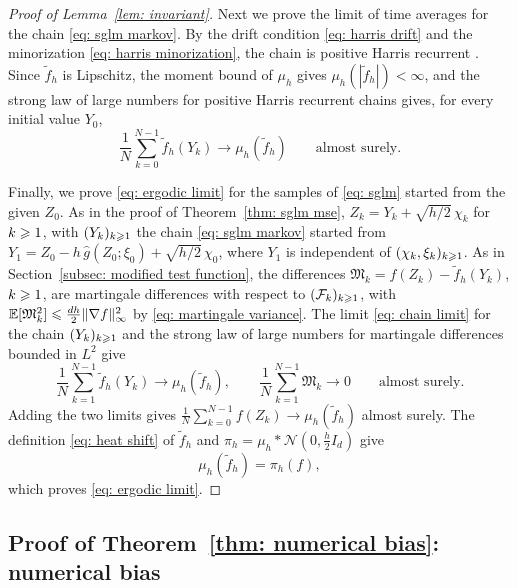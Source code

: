 \begin{proof}[Proof of Lemma~\ref{lem: invariant}]
    Next we prove the limit of time averages for the chain \eqref{eq: sglm markov}. By the drift condition \eqref{eq: harris drift} and the minorization \eqref{eq: harris minorization}, the chain is positive Harris recurrent \citep{meyn1993markov}. Since $\tilde f_h$ is Lipschitz, the moment bound of $\mu_h$ gives $\mu_h(|\tilde f_h|) < \infty$, and the strong law of large numbers for positive Harris recurrent chains \citep[Theorem~17.0.1(i)]{meyn1993markov} gives, for every initial value $Y_0$,
    \begin{equation}
        \frac1N \sum_{k=0}^{N-1} \tilde f_h(Y_k) \to \mu_h(\tilde f_h) \qquad \text{almost surely} .
        \label{eq: chain limit}
    \end{equation}

    Finally, we prove \eqref{eq: ergodic limit} for the samples of \eqref{eq: sglm} started from the given $Z_0$. As in the proof of Theorem~\ref{thm: sglm mse}, $Z_k = Y_k + \sqrt{h/2}\,\chi_k$ for $k \geqslant 1$, with $(Y_k)_{k \geqslant 1}$ the chain \eqref{eq: sglm markov} started from $Y_1 = Z_0 - h\, \hat g(Z_0;\xi_0) + \sqrt{h/2}\,\chi_0$, where $Y_1$ is independent of $(\chi_k, \xi_k)_{k \geqslant 1}$. As in Section~\ref{subsec: modified test function}, the differences $\mathfrak M_k = f(Z_k) - \tilde f_h(Y_k)$, $k \geqslant 1$, are martingale differences with respect to $(\mathcal F_k)_{k \geqslant 1}$, with $\mathbb E[\mathfrak M_k^2] \leqslant \frac{dh}{2} \lVert \nabla f \rVert_\infty^2$ by \eqref{eq: martingale variance}. The limit \eqref{eq: chain limit} for the chain $(Y_k)_{k \geqslant 1}$ and the strong law of large numbers for martingale differences bounded in $L^2$ give
    \begin{equation*}
        \frac1N \sum_{k=1}^{N-1} \tilde f_h(Y_k) \to \mu_h(\tilde f_h) , \qquad \frac1N \sum_{k=1}^{N-1} \mathfrak M_k \to 0 \qquad \text{almost surely} .
    \end{equation*}
    Adding the two limits gives $\frac1N \sum_{k=0}^{N-1} f(Z_k) \to \mu_h(\tilde f_h)$ almost surely. The definition \eqref{eq: heat shift} of $\tilde f_h$ and $\pi_h = \mu_h * \mathcal N(0, \frac h2 I_d)$ give
    \begin{equation}
        \mu_h(\tilde f_h) = \pi_h(f) ,
        \label{eq: heat shift invariant}
    \end{equation}
    which proves \eqref{eq: ergodic limit}.
\end{proof}

\subsection{Proof of Theorem~\ref{thm: numerical bias}: numerical bias}
\label{sec: numerical bias proof}

